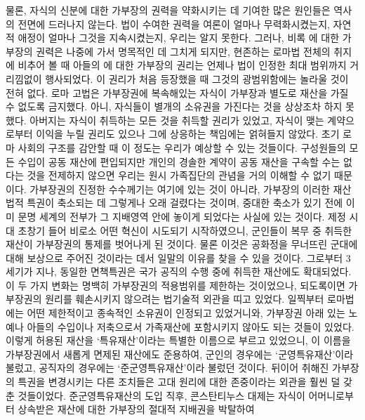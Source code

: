물론,
자식의 신분에 대한 가부장의 권력을 약화시키는 데 기여한 많은 원인들은
역사의 전면에 드러나지 않는다.
법이 수여한 권력을 여론이 얼마나 무력화시켰는지,
자연적 애정이 얼마나 그것을 지속시켰는지,
우리는 알지 못한다.
그러나, 비록 에 대한 가부장의 권력은 나중에 가서
명목적인 데 그치게 되지만,
현존하는 로마법 전체의 취지에 비추어 볼 때
아들의 에 대한 가부장의 권리는 언제나
법이 인정한 최대 범위까지 거리낌없이 행사되었다.
이 권리가 처음 등장했을 때 그것의 광범위함에는 놀라울 것이 전혀 없다.
로마 고법은 가부장권에 복속해있는 자식이 가부장과 별도로 재산을
가질 수 없도록 금지했다. 아니, 
자식들이 별개의 소유권을 가진다는 것을 상상조차 하지 못했다.
아버지는 자식이 취득하는 모든 것을 취득할 권리가 있었고,
자식이 맺는 계약으로부터 이익을 누릴 권리도 있으나
그에 상응하는 책임에는 얽혀들지 않았다.
초기 로마 사회의 구조를 감안할 때
이 정도는 우리가 예상할 수 있는 것들이다.
구성원들의 모든 수입이 공동 재산에 편입되지만
개인의 경솔한 계약이 공동 재산을 구속할 수는 없다는 것을
전제하지 않으면 우리는 원시 가족집단의 관념을 거의 이해할 수 없기 때문이다.
가부장권의 진정한 수수께기는 여기에 있는 것이 아니라,
가부장의 이러한 재산법적 특권이 축소되는 데 그렇게나 오래 걸렸다는 것이며,
중대한 축소가 있기 전에 이미 문명 세계의 전부가 그 지배영역 안에
놓이게 되었다는 사실에 있는 것이다.
제정 시대 초창기 들어 비로소 어떤 혁신이 시도되기 시작하였으니,
군인들이 복무 중 취득한 재산이 가부장권의 통제를 벗어나게 된 것이다.
물론 이것은 공화정을 무너뜨린 군대에 대해 보상으로 주어진 것이라는 데서
일말의 이유를 찾을 수 있을 것이다.
그로부터 3세기가 지나, 동일한 면책특권은 국가 공직의 수행 중에 취득한 재산에도
확대되었다.
이 두 가지 변화는 명백히 가부장권의 적용범위를 제한하는 것이었으나,
되도록이면 가부장권의 원리를 훼손시키지 않으려는 법기술적 외관을 띠고 있었다.
일찍부터 로마법에는 어떤 제한적이고 종속적인 소유권이 인정되고 있었거니와,
가부장권 아래 있는 노예나 아들의 수입이나 저축으로서
가족재산에 포함시키지 않아도 되는 것들이 있었다. 이렇게 허용된 재산을
`특유재산'이라는 특별한 이름으로 부르고 있었으니,
이 이름을 가부장권에서 새롭게 면제된 재산에도 준용하여,
군인의 경우에는 `군영특유재산'이라
불렀고, 공직자의 경우에는
`준군영특유재산'이라
불렀던 것이다.
뒤이어 취해진 가부장의 특권을 변경시키는 다른 조치들은
고대 원리에 대한 존중이라는 외관을 훨씬 덜 갖춘 것들이었다.
준군영특유재산의 도입 직후,
콘스탄티누스 대제는 자식이 어머니로부터 상속받은 재산에 대한
가부장의 절대적 지배권을 박탈하여
